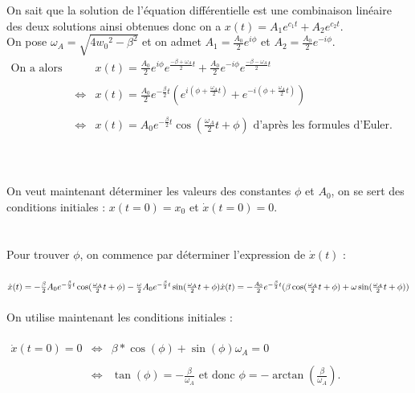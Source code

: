 \documentclass[a4paper,10pt]{book}
\begin{document}
On sait que la solution de l'équation différentielle est une combinaison linéaire des deux solutions ainsi obtenues donc on a $x(t)=A_{1}e^{c_{1}t}+A_{2}e^{c_{2}t}$.\\

On pose $\omega_{A}=\sqrt{4w_{0}{}^{2}-\beta^{2}}$ et on admet $A_{1}=\frac{A_{0}}{2}e^{i\phi}$ et $A_{2}=\frac{A_{0}}{2}e^{-i\phi}$.\\

$\begin{array}{rcl} \text{On a alors } && x(t)=\frac{A_{0}}{2}e^{i\phi}e^{\frac{-\beta+\omega_{A}}{2}t}+\frac{A_{0}}{2}e^{-i\phi}e^{\frac{-\beta-\omega_{A}}{2}t}\\\\
&\Leftrightarrow & x(t)=\frac{A_{0}}{2}e^{-\frac{\beta}{2}t}(e^{i(\phi +\frac{\omega_{A}}{2}t)}+e^{-i(\phi+\frac{\omega_{A}}{2}t)}) \\\\
&\Leftrightarrow & x(t)=A_{0}e^{-\frac{\beta}{2}t}\cos(\frac{\omega_{A}}{2}t+\phi)\text{ d'après les formules d'Euler.} \end{array}$\\\\\\\\

On veut maintenant déterminer les valeurs des constantes $\phi$ et $A_{0}$, on se sert des conditions initiales : $x(t=0)=x_{0}$ et $\dot{x}(t=0)=0$. \\\\\\

Pour trouver $\phi$, on commence par déterminer l'expression de $\dot{x}(t)$ : \\\\
$\dot{x}(t)=-\frac{\beta}{2}A_{0}e^{-\frac{\beta}{2}t}\cos(\frac{\omega_{A}}{2}t+\phi)-\frac{\omega}{2}A_{0}e^{-\frac{\beta}{2}t}\sin(\frac{\omega_{A}}{2}t+\phi)\\\\
\dot{x}(t)=-\frac{A_{0}}{2}e^{-\frac{\beta}{2}t}(\beta\cos(\frac{\omega_{A}}{2}t+\phi)+\omega\sin(\frac{\omega_{A}}{2}t+\phi))$\\\\

On utilise maintenant les conditions initiales :\\\\
$\begin{array}{rcl} \dot{x}(t=0)=0 &\Leftrightarrow &\beta *\cos(\phi)+\sin(\phi)\omega_{A}=0\\\\
&\Leftrightarrow &\tan(\phi)=-\frac{\beta}{\omega_{A}} \text{ et donc }\phi=-\arctan(\frac{\beta}{\omega_{A}}). \end{array}$\\\\
\end{document}
